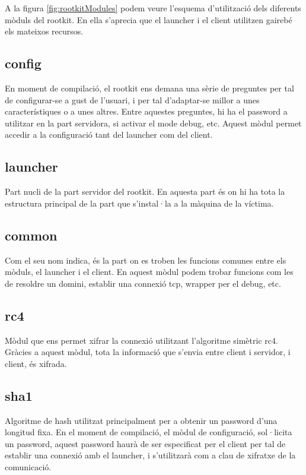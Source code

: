 A la figura \ref{fig:rootkitModules} podem veure l'esquema d'utilització dels diferents mòduls 
del rootkit. En ella s'aprecia que el launcher i el client utilitzen gairebé els mateixos recursos.\\
\subsection{config}

En moment de compilació, el rootkit ens demana una sèrie de preguntes per tal de configurar-se a gust
de l'usuari, i per tal d'adaptar-se millor a unes característiques o a unes altres. Entre aquestes
preguntes, hi ha el password a utilitzar en la part servidora, si activar el mode debug, etc. Aquest
mòdul permet accedir a la configuració tant del launcher com del client.

\subsection{launcher}

Part nucli de la part servidor del rootkit. En aquesta part és on hi ha tota la estructura principal
de la part que s'instal·la a la màquina de la víctima.

\subsection{common}

Com el seu nom indica, és la part on es troben les funcions comunes entre els mòduls, el launcher 
i el client. En aquest mòdul podem trobar funcions com les de resoldre un domini, establir una connexió
tcp, wrapper per el debug, etc.

\subsection{rc4}

Mòdul que ens permet xifrar la connexió utilitzant l'algoritme simètric rc4. Gràcies a aquest mòdul,
tota la informació que s'envia entre client i servidor, i client, és xifrada. 

\subsection{sha1}

Algoritme de hash utilitzat principalment per a obtenir un password d'una longitud fixa. En el moment
de compilació, el mòdul de configuració, sol·licita un password, aquest password haurà de ser especificat
per el client per tal de establir una connexió amb el launcher, i s'utilitzarà com a clau de xifratxe
de la comunicació.

